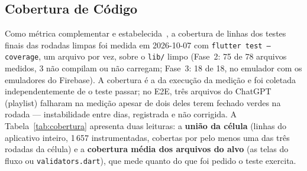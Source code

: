 \documentclass[12pt]{article}
\begin{document}
\subsection{Cobertura de Código}
\label{subsec:res-cobertura}

Como métrica complementar e estabelecida~\cite{baltes2026guidelines}, a
cobertura de linhas dos testes finais das rodadas limpas foi medida em
2026-10-07 com \texttt{flutter test --coverage}, um arquivo por vez, sobre o
\texttt{lib/} limpo (Fase~2: 75 de 78 arquivos medidos, 3 não compilam ou não
carregam; Fase~3: 18 de 18, no emulador com os emuladores do Firebase). A
cobertura é a da execução da medição e foi coletada independentemente de o
teste passar; no E2E, três arquivos do ChatGPT (playlist) falharam na
medição apesar de dois deles terem fechado verdes na rodada --- instabilidade
entre dias, registrada e não corrigida. A Tabela~\ref{tab:cobertura}
apresenta duas leituras: a \textbf{união da célula} (linhas do aplicativo
inteiro, 1\,657 instrumentadas, cobertas por pelo menos uma das três rodadas
da célula) e a \textbf{cobertura média dos arquivos do alvo} (as telas do
fluxo ou \texttt{validators.dart}), que mede quanto do que foi pedido o teste
exercita.
\end{document}
